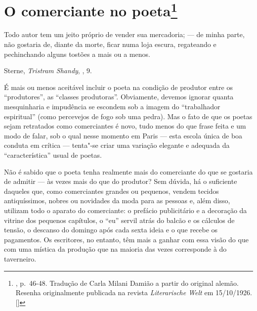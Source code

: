 \chapter{O comerciante no poeta\footnote[*]{ , p.~46-48. Tradução de Carla Milani Damião a partir do %
  original alemão. Resenha originalmente publicada na revista
  \emph{Literarische Welt} em 15/10/1926. []}}

\epigraph{Todo autor tem um jeito próprio de vender sua mercadoria; --- de minha
parte, não gostaria de, diante da morte, ficar numa loja escura,
regateando e pechinchando alguns tostões a mais ou a menos.}{Sterne, \emph{Tristram Shandy}, , 9.\footnotemark}


É mais ou menos aceitável incluir o poeta na condição de produtor entre
os ``produtores'', as ``classes produtoras''. Obviamente, devemos ignorar
quanta mesquinharia e impudência se escondem sob a imagem do
``trabalhador espiritual'' (como percevejos de fogo sob uma pedra). Mas o
fato de que os poetas sejam retratados como comerciantes é novo, tudo
menos do que frase feita e um modo de falar, sob o qual nesse momento em
Paris --- esta escola única de boa conduta em crítica --- tenta"-se criar
uma variação elegante e adequada da ``característica'' usual de poetas.

Não é sabido que o poeta tenha realmente mais do comerciante do que se
gostaria de admitir --- às vezes mais do que do produtor? Sem dúvida, há o
suficiente daqueles que, como comerciantes grandes ou pequenos, vendem
tecidos antiquíssimos, nobres ou novidades da moda para as pessoas e,
além disso, utilizam todo o aparato do comerciante: o prefácio
publicitário e a decoração da vitrine dos pequenos capítulos, o ``eu''
servil atrás do balcão e os cálculos de tensão, o descanso do domingo
após cada sexta ideia e o que recebe os pagamentos. Os escritores, no
entanto, têm mais a ganhar com essa visão do que com uma mística da
produção que na maioria das vezes corresponde à do taverneiro.

